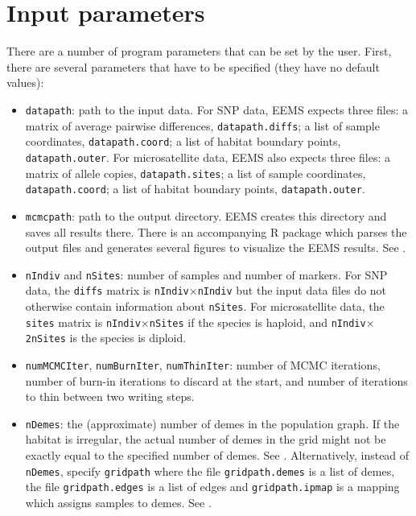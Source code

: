 \documentclass[a4paper,10pt,DIV=15,titlepage,mpinclude=true]{scrartcl}
\newcommand{\keystring}[1]{{\tt #1}}
\begin{document}
\newpage

\section{Input parameters}

There are a number of program parameters that can be set by the user. First, there are several parameters that have to be specified (they have no default values):
\begin{itemize}
  \item \keystring{datapath}: path to the input data. For SNP data, EEMS expects three files: a matrix of average pairwise differences, \keystring{datapath.diffs}; a list of sample coordinates, \keystring{datapath.coord}; a list of habitat boundary points, \keystring{datapath.outer}. For microsatellite data, EEMS also expects three files: a matrix of allele copies, \keystring{datapath.sites}; a list of sample coordinates, \keystring{datapath.coord}; a list of habitat boundary points, \keystring{datapath.outer}.
  \item \keystring{mcmcpath}: path to the output directory. EEMS creates this directory and saves all results there. There is an accompanying R package which parses the output files and generates several figures to visualize the EEMS results. See .
  \item \keystring{nIndiv} and \keystring{nSites}: number of samples and number of markers. For SNP data, the \keystring{diffs} matrix is \keystring{nIndiv}$\times$\keystring{nIndiv} but the input data files do not otherwise contain information about \keystring{nSites}. For microsatellite data, the \keystring{sites} matrix is \keystring{nIndiv}$\times$\keystring{nSites} if the species is haploid, and \keystring{nIndiv}$\times$\keystring{2nSites} is the species is diploid.
  \item \keystring{numMCMCIter}, \keystring{numBurnIter}, \keystring{numThinIter}: number of MCMC iterations, number of burn-in iterations to discard at the start, and number of iterations to thin between two writing steps.
  \item \keystring{nDemes}: the (approximate) number of demes in the population graph. If the habitat is irregular, the actual number of demes in the grid might not be exactly equal to the specified number of demes. See . Alternatively, instead of \keystring{nDemes}, specify \keystring{gridpath} where the file \keystring{gridpath.demes} is a list of demes, the file \keystring{gridpath.edges} is a list of edges and \keystring{gridpath.ipmap} is a mapping which assigns samples to demes. See .
\end{itemize}
\end{document}
